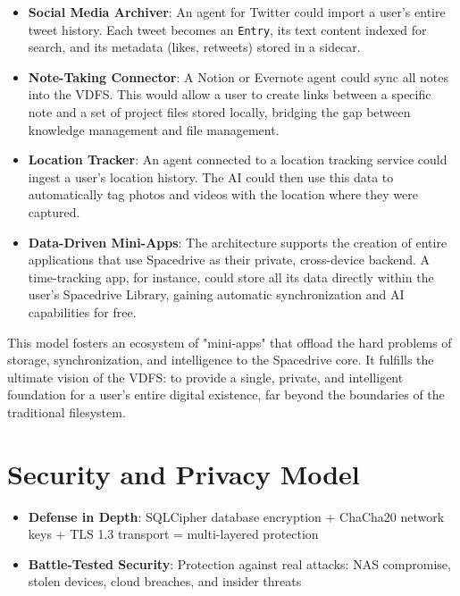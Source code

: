 \documentclass[sigconf]{acmart}
\begin{document}
\begin{itemize}[noitemsep, topsep=0pt]
    \item \textbf{Social Media Archiver}: An agent for Twitter could import a user's entire tweet history. Each tweet becomes an \texttt{Entry}, its text content indexed for search, and its metadata (likes, retweets)
stored in a sidecar.

    \item \textbf{Note-Taking Connector}: A Notion or Evernote agent could sync all notes into the VDFS. This would allow a user to create links between a specific note and a set of project files stored locally,
bridging the gap between knowledge management and file management.

    \item \textbf{Location Tracker}: An agent connected to a location tracking service could ingest a user's location history. The AI could then use this data to automatically tag photos and videos with the location
where they were captured.

    \item \textbf{Data-Driven Mini-Apps}: The architecture supports the creation of entire applications that use Spacedrive as their private, cross-device backend. A time-tracking app, for instance, could store all its
data directly within the user's Spacedrive Library, gaining automatic synchronization and AI capabilities for free.
\end{itemize}

This model fosters an ecosystem of "mini-apps" that offload the hard problems of storage, synchronization, and intelligence to the Spacedrive core. It fulfills the ultimate vision of the VDFS: to provide a single,
private, and intelligent foundation for a user's entire digital existence, far beyond the boundaries of the traditional filesystem.





\section{Security and Privacy Model}

\begin{keytakeaways}
\begin{itemize}[noitemsep, topsep=0pt]
\item \textbf{Defense in Depth}: SQLCipher database encryption + ChaCha20 network keys + TLS 1.3 transport = multi-layered protection
\item \textbf{Battle-Tested Security}: Protection against real attacks: NAS compromise, stolen devices, cloud breaches, and insider threats
\end{itemize}
\end{keytakeaways}
\end{document}
